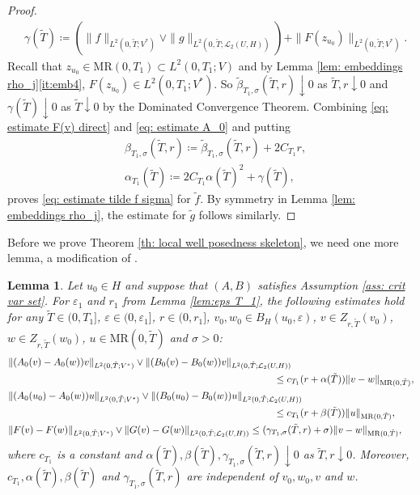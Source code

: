 \documentclass{amsart}
\renewcommand{\MR}{\mathrm{MR}}
\newcommand{\UH}{\mathcal{L}_2(U,H)}
\newcommand{\<}{\langle}
\newcommand{\?}{\rangle}
\theoremstyle{plain}
\theoremstyle{remark}
\theoremstyle{plain}
\newtheorem{lemma}[theorem]{Lemma}
\numberwithin{equation}{section}
\newcommand{\eps}{\varepsilon}
\begin{document}
\begin{proof}
\begin{align*}
&\gamma(\tilde{T})\coloneqq (\|f\|_{L^2(0,\tilde{T};V^*)}\vee\|g\|_{L^2(0,\tilde{T};\UH)})+\|F(z_{u_0})\|_{L^2(0,\tilde{T};V^*)}.
\end{align*}
Recall that $z_{u_0}\in \MR(0,T_1)\subset L^2(0,T_1;V)$ and by Lemma \ref{lem: embeddings rho_j}\ref{it:emb4}, $F(z_{u_0})\in L^2(0,T_1;V^*)$. So  $\tilde{\beta}_{T_1,\sigma}(\tilde{T},r)\downarrow 0$ as $\tilde{T},r\downarrow0$ and $\gamma(\tilde{T})\downarrow 0$ as $\tilde{T}\downarrow0$ by the Dominated Convergence Theorem.
Combining \eqref{eq: estimate F(v) direct} and \eqref{eq: estimate A_0} and putting
\begin{align*}
&\beta_{T_1,\sigma}(\tilde{T},r)\coloneqq  \tilde{\beta}_{T_1,\sigma}(\tilde{T},r)+2C_{T_1}r,\\
&\alpha_{T_1}(\tilde{T})\coloneqq 2C_{T_1}\alpha(\tilde{T})^2+\gamma(\tilde{T}),
\end{align*}
proves  \eqref{eq: estimate tilde f sigma} for $\tilde{f}$. By symmetry in Lemma \ref{lem: embeddings rho_j}, the estimate for $\tilde{g}$ follows similarly.
\end{proof}

Before we prove Theorem \ref{th: local well posedness skeleton}, we need one more lemma, a modification of \cite[Lemma 18.2.12]{HNVWvolume3}.

\begin{lemma}\label{lem: lipschitz estimates}
Let $u_0\in H$ and suppose that $(A,B)$ satisfies Assumption \ref{ass: crit var set}.
For $\eps_1$ and $r_1$ from Lemma \ref{lem:eps T_1},  the following estimates hold for any $\tilde{T}\in(0,T_1]$, $\eps\in(0,\eps_1]$, $r\in(0,r_1]$, $v_0, w_0\in B_H(u_0,\eps)$, $v\in Z_{r,\tilde{T}}(v_0)$, $w\in Z_{r,\tilde{T}}(w_0)$, $u\in\MR(0,\tilde{T})$ and $\sigma>0$:
\begin{align*}
&\|(A_0(v)-A_0(w))v\|_{L^2(0,\tilde{T};V^*)}\vee\|(B_0(v)-B_0(w))v\|_{L^2(0,\tilde{T};\UH)}\\
& \hspace{9.5cm}\leq c_{T_1}(r+\alpha(\tilde{T}))\|v-w\|_{\MR(0,\tilde{T})},\\
&\|(A_0(u_0)-A_0(w))u\|_{L^2(0,\tilde{T};V^*)}\vee\|(B_0(u_0)-B_0(w))u\|_{L^2(0,\tilde{T};\UH)}\\
& \hspace{9.5cm}\leq c_{T_1}(r+\beta(\tilde{T}))\|u\|_{\MR(0,\tilde{T})},\\
&\|F(v)-F(w)\|_{L^2(0,\tilde{T};V^*)}\vee\|G(v)-G(w)\|_{L^2(0,\tilde{T};\UH)}\leq (\gamma_{T_1,\sigma}(\tilde{T},r)+\sigma)\|v-w\|_{\MR(0,\tilde{T})}, 
\end{align*}
where $c_{T_1}$ is a constant and $\alpha(\tilde{T}),\beta(\tilde{T}),\gamma_{T_1,\sigma}(\tilde{T},r)\downarrow 0$ as $\tilde{T},r\downarrow0$. Moreover,  $c_{T_1},\alpha(\tilde{T}),\beta(\tilde{T})$ and $\gamma_{T_1,\sigma}(\tilde{T},r)$ are independent of $v_0,w_0,v$ and $w$.  
\end{lemma}
\end{document}

